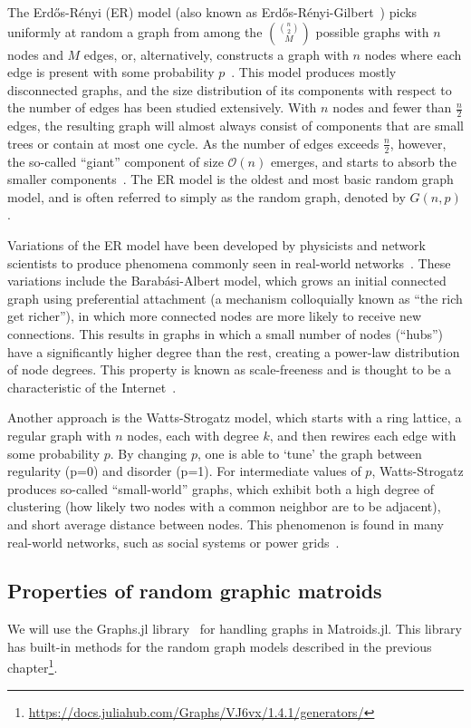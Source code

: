 The Erdős-Rényi (ER) model (also known as Erdős-Rényi-Gilbert~\cite{fienberg-2012}) picks uniformly at random a graph from among the $\binom{\binom{n}{2}}{M}$ possible graphs with $n$ nodes and $M$ edges, or, alternatively, constructs a graph with $n$ nodes where each edge is present with some probability $p$~\cite{erdos-1959, gilbert-1959}. This model produces mostly disconnected graphs, and the size distribution of its components with respect to the number of edges has been studied extensively. With $n$ nodes and fewer than $\frac{n}{2}$ edges, the resulting graph will almost always consist of components that are small trees or contain at most one cycle. As the number of edges exceeds $\frac{n}{2}$, however, the so-called ``giant'' component of size $\mathcal{O}(n)$ emerges, and starts to absorb the smaller components~\cite{janson1993birth}. The ER model is the oldest and most basic random graph model, and is often referred to simply as the random graph, denoted by $G(n,p)$.

Variations of the ER model have been developed by physicists and network scientists to produce phenomena commonly seen in real-world networks~\cite{fienberg-2012}. These variations include the Barabási-Albert model, which grows an initial connected graph using preferential attachment (a mechanism colloquially known as ``the rich get richer''), in which more connected nodes are more likely to receive new connections. This results in graphs in which a small number of nodes (``hubs'') have a significantly higher degree than the rest, creating a power-law distribution of node degrees. This property is known as scale-freeness and is thought to be a characteristic of the Internet~\cite{barabasi-albert}. 

Another approach is the Watts-Strogatz model, which starts with a ring lattice, a regular graph with $n$ nodes, each with degree $k$, and then rewires each edge with some probability $p$. By changing $p$, one is able to `tune' the graph between regularity (p=0) and disorder (p=1). For intermediate values of $p$, Watts-Strogatz produces so-called ``small-world'' graphs, which exhibit both a high degree of clustering (how likely two nodes with a common neighbor are to be adjacent), and short average distance between nodes. This phenomenon is found in many real-world networks, such as social systems or power grids~\cite{Watts-1998}.

\subsection{Properties of random graphic matroids}
We will use the Graphs.jl library~\cite{Graphs2021} for handling graphs in Matroids.jl. This library has built-in methods for the random graph models described in the previous chapter\footnote{\href{https://docs.juliahub.com/Graphs/VJ6vx/1.4.1/generators/}{https://docs.juliahub.com/Graphs/VJ6vx/1.4.1/generators/}}. 


